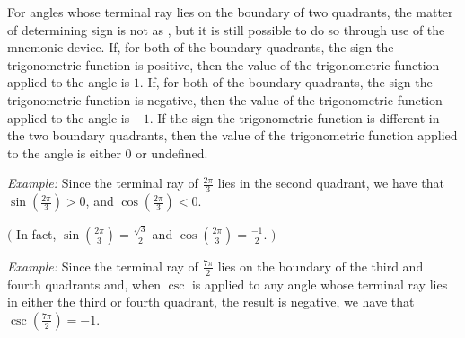 \documentclass[12pt]{article}
\begin{document}
For angles whose terminal ray lies on the boundary of two quadrants, the matter of determining sign is not as , but it is still possible to do so through use of the mnemonic device.  If, for both of the boundary quadrants, the sign  the trigonometric function is positive, then the value of the trigonometric function applied to the angle is $1$.  If, for both of the boundary quadrants, the sign  the trigonometric function is negative, then the value of the trigonometric function applied to the angle is $-1$.  If the sign  the trigonometric function is different in the two boundary quadrants, then the value of the trigonometric function applied to the angle is either $0$ or undefined.

{\sl Example:\/}  Since the terminal ray of $\displaystyle \frac{2\pi}{3}$ lies in the second quadrant, we have that $\displaystyle \sin \left( \frac{2\pi}{3} \right)>0$, and $\displaystyle \cos \left( \frac{2\pi}{3} \right)<0$.

$\bigg($ In fact, $\displaystyle \sin \left( \frac{2\pi}{3} \right)=\frac{\sqrt{3}}{2}$ and $\displaystyle \cos \left( \frac{2\pi}{3} \right)=\frac{-1}{2}$. $\bigg)$

{\sl Example:\/} Since the terminal ray of $\displaystyle \frac{7\pi}{2}$ lies on the boundary of the third and fourth quadrants and, when $\csc$ is applied to any angle whose terminal ray lies in either the third or fourth quadrant, the result is negative, we have that $\displaystyle \csc \left( \frac{7\pi}{2} \right)=-1$.
\end{document}
